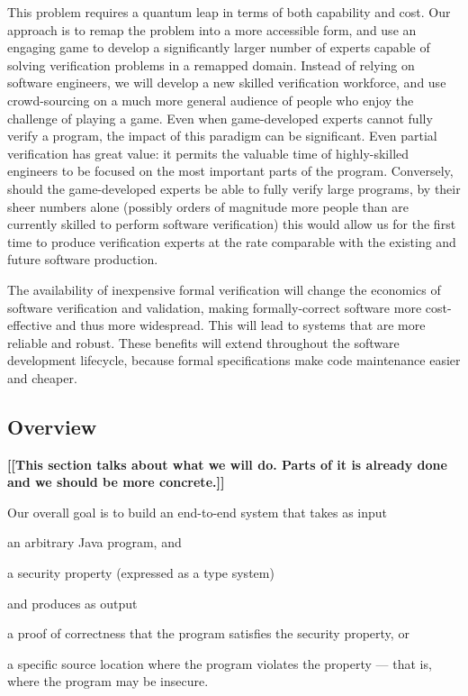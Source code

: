 \documentclass[preprint]{sig-alternate}
\newcommand{\todo}[1]{{\color{red}\bfseries [[#1]]}}
\let\Itemize =\itemize
\def\Nospacing{\itemsep=0pt\topsep=0pt\partopsep=0pt\parskip=0pt\parsep=0pt}
\renewenvironment{itemize}{\Itemize\Nospacing}{\endlist}
\begin{document}
This problem requires a quantum leap in terms of both capability and
cost.  Our approach is to remap the problem into a more accessible
form, and use an engaging game to develop a significantly larger
number of experts capable of solving verification problems in a
remapped domain.  Instead of relying on software engineers, we will
develop a new skilled verification workforce, and use crowd-sourcing
on a much more general audience of people who enjoy the challenge of
playing a game.  Even when game-developed experts cannot fully verify
a program, the impact of this paradigm can be significant.  Even
partial verification has great value: it permits the valuable time of
highly-skilled engineers to be focused on the most important parts of
the program.  Conversely, should the game-developed experts be able to
fully verify large programs, by their sheer numbers alone (possibly
orders of magnitude more people than are currently skilled to perform
software verification) this would allow us for the first time to
produce verification experts at the rate comparable with the existing
and future software production.

The availability of inexpensive formal verification will change the
economics of software verification and validation, making
formally-correct software more cost-effective and thus more
widespread.  This will lead to systems that are more reliable and
robust.  These benefits will extend throughout the software
development lifecycle, because formal specifications make code
maintenance easier and cheaper.


\subsection{Overview}

\todo{This section talks about what we will do. Parts of it is already
  done and we should be more concrete.}

Our overall goal is to build an end-to-end system that takes as input

\begin{itemize}
\item
 an arbitrary Java program, and
\item
 a security property (expressed as a type system)
\end{itemize}

\noindent
and produces as output

\begin{itemize}
\item
 a proof of correctness that the program satisfies the security property,
 or
\item
 a specific source location where the program violates the property
 --- that is, where the program may be insecure.
\end{itemize}
\end{document}
